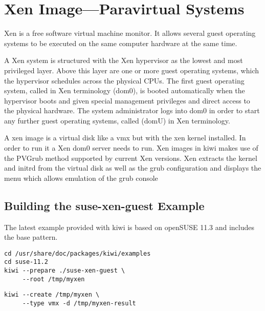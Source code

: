 \chapter{Xen Image---Paravirtual Systems}
\label{chapter:xen}
\minitoc

Xen is a free software virtual machine monitor. It allows several
guest operating systems to be executed on the same computer hardware
at the same time.

A Xen system is structured with the Xen hypervisor as the lowest and
most privileged layer.%
Above this layer are one or more guest
operating systems, which the hypervisor schedules across the physical
CPUs. The first guest operating system, called in Xen terminology
 (dom0), is booted automatically when the hypervisor boots
and given special management privileges and direct access to the physical
hardware. The system administrator logs into dom0 in order to start
any further guest operating systems, called  (domU) in
Xen terminology.

A xen image is a virtual disk like a vmx but with the xen kernel
installed. In order to run it a Xen dom0 server needs to run. Xen
images in kiwi makes use of the PVGrub method supported by current
Xen versions. Xen extracts the kernel and initrd from the virtual
disk as well as the grub configuration and displays the menu which
allows emulation of the grub console

\section{Building the suse-xen-guest Example}

The latest example provided with kiwi is based on openSUSE 11.3 and includes
the base pattern. 

\begin{Command}{12cm}
\begin{verbatim}
cd /usr/share/doc/packages/kiwi/examples
cd suse-11.2
kiwi --prepare ./suse-xen-guest \
     --root /tmp/myxen
\end{verbatim}
\end{Command}

\begin{Command}{12cm}
\begin{verbatim}
kiwi --create /tmp/myxen \
     --type vmx -d /tmp/myxen-result
\end{verbatim}
\end{Command}


